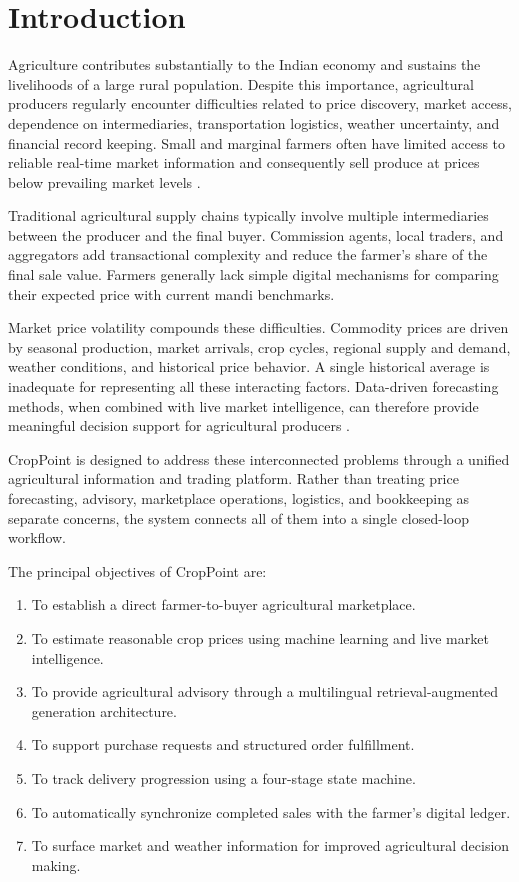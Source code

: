 \documentclass[conference]{IEEEtran}
\begin{document}
\section{Introduction}

Agriculture contributes substantially to the Indian economy and
sustains the livelihoods of a large rural population. Despite this
importance, agricultural producers regularly encounter difficulties
related to price discovery, market access, dependence on
intermediaries, transportation logistics, weather uncertainty, and
financial record keeping. Small and marginal farmers often have
limited access to reliable real-time market information and
consequently sell produce at prices below prevailing market
levels \cite{chand2012}.

Traditional agricultural supply chains typically involve multiple
intermediaries between the producer and the final buyer. Commission
agents, local traders, and aggregators add transactional complexity
and reduce the farmer's share of the final sale value. Farmers
generally lack simple digital mechanisms for comparing their
expected price with current mandi benchmarks.

Market price volatility compounds these difficulties. Commodity
prices are driven by seasonal production, market arrivals, crop
cycles, regional supply and demand, weather conditions, and
historical price behavior. A single historical average is inadequate
for representing all these interacting factors. Data-driven
forecasting methods, when combined with live market intelligence,
can therefore provide meaningful decision support for agricultural
producers \cite{liakos2018}.

CropPoint is designed to address these interconnected problems
through a unified agricultural information and trading platform.
Rather than treating price forecasting, advisory, marketplace
operations, logistics, and bookkeeping as separate concerns, the
system connects all of them into a single closed-loop workflow.

The principal objectives of CropPoint are:
\begin{enumerate}
    \item To establish a direct farmer-to-buyer agricultural
    marketplace.
    \item To estimate reasonable crop prices using machine learning
    and live market intelligence.
    \item To provide agricultural advisory through a multilingual
    retrieval-augmented generation architecture.
    \item To support purchase requests and structured order
    fulfillment.
    \item To track delivery progression using a four-stage state
    machine.
    \item To automatically synchronize completed sales with the
    farmer's digital ledger.
    \item To surface market and weather information for improved
    agricultural decision making.
\end{enumerate}
\end{document}
